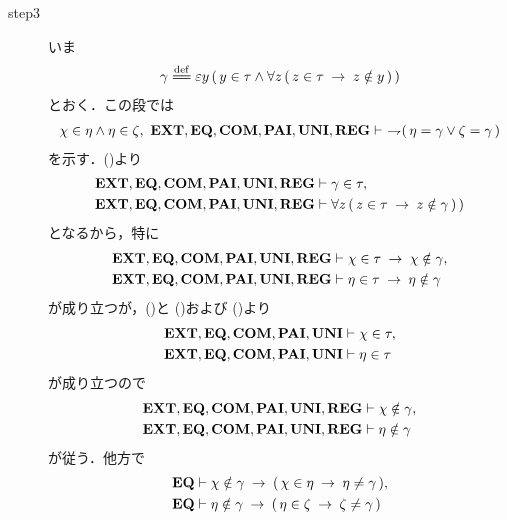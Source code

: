 \begin{sketch}
\begin{description}
			\item[step3]
				いま
				\begin{align}
					\gamma \defeq \varepsilon y\, (\, y \in \tau \wedge \forall z\, (\, z \in \tau \rarrow z \notin y\, )\, )
				\end{align}
				とおく．この段では
				\begin{align}
					\chi \in \eta \wedge \eta \in \zeta,\ 
					\EXTAX,\EQAX,\COMAX,\PAIAX,\UNIAX,\REGAX \vdash\ 
					\negation (\, \eta = \gamma \vee \zeta = \gamma\, )
				\end{align}
				を示す．()より
				\begin{align}
					\mbox{{\bf EXT}},\mbox{{\bf EQ}},\mbox{\bf COM},\mbox{{\bf PAI}},\mbox{{\bf UNI}},\mbox{{\bf REG}} &\vdash \gamma \in \tau, 
					\label{fom:no_three_sets_go_round_13} \\
					\mbox{{\bf EXT}},\mbox{{\bf EQ}},\mbox{\bf COM},\mbox{{\bf PAI}},\mbox{{\bf UNI}},\mbox{{\bf REG}} &\vdash 
					\forall z\, (\, z \in \tau \hspace{0.25em}\rightarrow\hspace{0.25em} z \notin \gamma\, )\, )
					\label{fom:no_three_sets_go_round_14}
				\end{align}
				となるから，特に
				\begin{align}
					\mbox{{\bf EXT}},\mbox{{\bf EQ}},\mbox{\bf COM},\mbox{{\bf PAI}},\mbox{{\bf UNI}},\mbox{{\bf REG}} &\vdash 
					\chi \in \tau \hspace{0.25em}\rightarrow\hspace{0.25em} \chi \notin \gamma, \\
					\mbox{{\bf EXT}},\mbox{{\bf EQ}},\mbox{\bf COM},\mbox{{\bf PAI}},\mbox{{\bf UNI}},\mbox{{\bf REG}} &\vdash 
					\eta \in \tau \hspace{0.25em}\rightarrow\hspace{0.25em} \eta \notin \gamma
				\end{align}
				が成り立つが，()と
				()および
				()より
				\begin{align}
					\mbox{{\bf EXT}},\mbox{{\bf EQ}},\mbox{\bf COM},\mbox{{\bf PAI}},\mbox{{\bf UNI}} &\vdash \chi \in \tau, \\
					\mbox{{\bf EXT}},\mbox{{\bf EQ}},\mbox{\bf COM},\mbox{{\bf PAI}},\mbox{{\bf UNI}} &\vdash \eta \in \tau
				\end{align}
				が成り立つので
				\begin{align}
					\mbox{{\bf EXT}},\mbox{{\bf EQ}},\mbox{\bf COM},\mbox{{\bf PAI}},\mbox{{\bf UNI}},\mbox{{\bf REG}} &\vdash 
					\chi \notin \gamma, \label{fom:no_three_sets_go_round_15} \\
					\mbox{{\bf EXT}},\mbox{{\bf EQ}},\mbox{\bf COM},\mbox{{\bf PAI}},\mbox{{\bf UNI}},\mbox{{\bf REG}} &\vdash 
					\eta \notin \gamma \label{fom:no_three_sets_go_round_16}
				\end{align}
				が従う．他方で
				\begin{align}
					\EQAX &\vdash \chi \notin \gamma \rarrow (\, \chi \in \eta \rarrow \eta \neq \gamma\, ), \\
					\EQAX &\vdash \eta \notin \gamma \rarrow (\, \eta \in \zeta \rarrow \zeta \neq \gamma\, )

\end{align}
\end{description}
\end{sketch}

